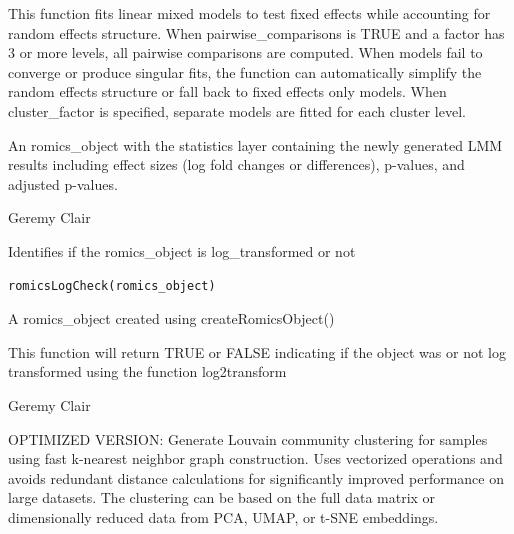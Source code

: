 \documentclass[a4paper]{book}
\begin{document}
%
\begin{Details}
This function fits linear mixed models to test fixed effects while accounting for random effects structure. When pairwise\_comparisons is TRUE and a factor has 3 or more levels, all pairwise comparisons are computed. When models fail to converge or produce singular fits, the function can automatically simplify the random effects structure or fall back to fixed effects only models. When cluster\_factor is specified, separate models are fitted for each cluster level.
\end{Details}
%
\begin{Value}
An romics\_object with the statistics layer containing the newly generated LMM results including effect sizes (log fold changes or differences), p-values, and adjusted p-values.
\end{Value}
%
\begin{Author}
Geremy Clair
\end{Author}
%
\begin{Description}
Identifies if the romics\_object is log\_transformed or not
\end{Description}
%
\begin{Usage}
\begin{verbatim}
romicsLogCheck(romics_object)
\end{verbatim}
\end{Usage}
%
\begin{Arguments}
\begin{ldescription}
\item[\code{romics\_object}] A romics\_object created using createRomicsObject()
\end{ldescription}
\end{Arguments}
%
\begin{Value}
This function will return TRUE or FALSE indicating if the object was or not log transformed using the function log2transform
\end{Value}
%
\begin{Author}
Geremy Clair
\end{Author}
%
\begin{Description}
OPTIMIZED VERSION: Generate Louvain community clustering for samples using fast k-nearest neighbor graph construction.
Uses vectorized operations and avoids redundant distance calculations for significantly improved performance on large datasets.
The clustering can be based on the full data matrix or dimensionally reduced data from PCA, UMAP, or t-SNE embeddings.
\end{Description}
\end{document}
